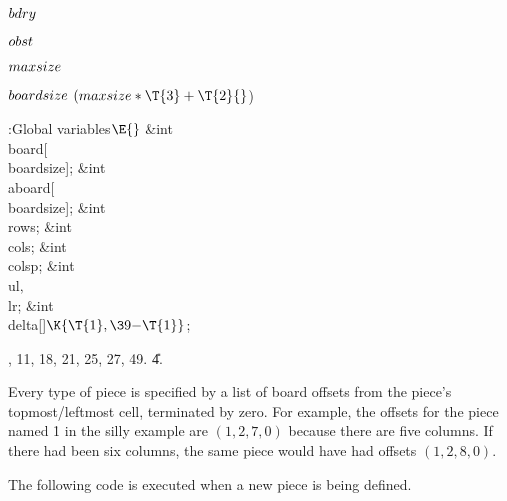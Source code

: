 \Y\B\4\D$\\{bdry}$ \5
\par
\B\4\D$\\{obst}$ \5
\par
\B\4\D$\\{maxsize}$ \5
\par
\B\4\D$\\{boardsize}$ \5
$(\\{maxsize}*\T{3}+\T{2}{}$)\par
\Y\B\4:Global variables\X${}\E{}$\6
\&{int} \\{board}[\\{boardsize}];\6
\&{int} \\{aboard}[\\{boardsize}];\6
\&{int} \\{rows};\6
\&{int} \\{cols};\6
\&{int} \\{colsp};\6
\&{int} \\{ul}${},{}$ \\{lr};\6
\&{int} \\{delta}[]${}\K\{\T{1},\39{-}\T{1}\}{}$;\par
{}, 11, 18, 21, 25, 27, 49.
\U4.\fi

Every type of piece is specified by a list of board offsets
from the
piece's topmost/leftmost cell, terminated by zero. For example, the
offsets for the piece named \.1 in the silly example are
$(1, 2, 7, 0)$ because there are five columns.
If there had been six columns, the same piece would have had
offsets $(1,2,8,0)$.

The following code is executed when a new piece is being defined.

